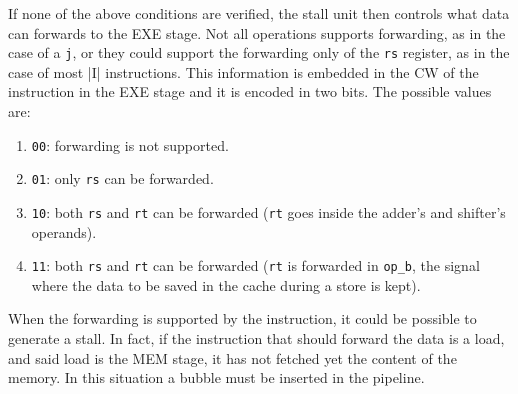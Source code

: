 If none of the above conditions are verified, the stall unit then controls what data can forwards to the EXE stage. Not all operations supports forwarding, as in the case of a \verb|j|, or they could support the
forwarding only of the \verb|rs| register, as in the case of most |I| instructions. This information is embedded in the CW of the instruction in the EXE stage and it is encoded in two bits. The possible values are:

\begin{enumerate}
    \item \verb|00|: forwarding is not supported.
    \item \verb|01|: only \verb|rs| can be forwarded.
    \item \verb|10|: both \verb|rs| and \verb|rt| can be forwarded (\verb|rt| goes inside the adder's and shifter's operands).
    \item \verb|11|: both \verb|rs| and \verb|rt| can be forwarded (\verb|rt| is forwarded in \verb|op_b|, the signal where the data to be saved in the cache during a store is kept).
\end{enumerate}

When the forwarding is supported by the instruction, it could be possible to generate a stall. In fact, if the instruction that should forward the data is a load, and said load is the MEM stage,
it has not fetched yet the content of the memory. In this situation a bubble must be inserted in the pipeline.